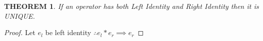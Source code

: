 \documentclass{article}
\newtheorem{theorem}{THEOREM}
\newtheorem{proof}{PROOF}
\begin{document}
\begin{theorem}
If an operator has both Left Identity and
Right Identity then it is \emph{UNIQUE}.
\end{theorem}

\begin{proof}
Let $e_{l}$ be left identity 
$\therefore e_{l} * e_{r} \implies e_{r}$
\end{proof}
\end{document}
